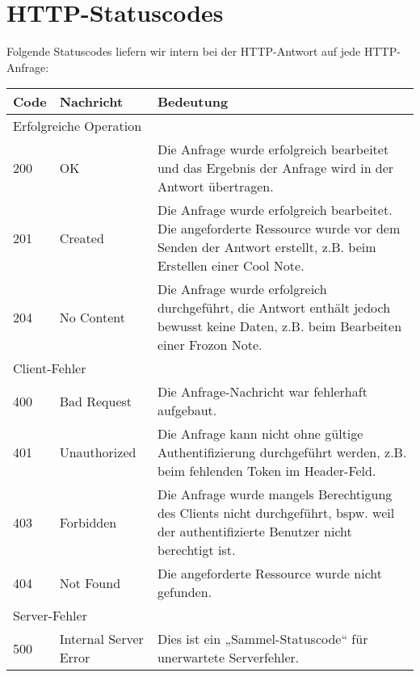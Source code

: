 \documentclass[a4paper]{scrreprt}
\begin{document}
	\section{HTTP-Statuscodes}
	Folgende Statuscodes liefern wir intern bei der HTTP-Antwort auf jede HTTP-Anfrage:
	\begin{flushleft}
		\begin{tabular}{|p{}|p{}|p{}|}
		\hline
		\textbf{Code} & \textbf{Nachricht} & \textbf{Bedeutung} \\
		\hline
		\multicolumn{3}{|l|}{Erfolgreiche Operation} \\
		\hline
		200 & OK & Die Anfrage wurde erfolgreich bearbeitet und das Ergebnis der Anfrage wird in der Antwort übertragen. \\
		201 & Created & Die Anfrage wurde erfolgreich bearbeitet. Die angeforderte Ressource wurde vor dem Senden der Antwort erstellt, z.B. beim Erstellen einer Cool Note. \\
		204 & No Content & Die Anfrage wurde erfolgreich durchgeführt, die Antwort enthält jedoch bewusst keine Daten, z.B. beim Bearbeiten einer Frozon Note. \\
		\hline
		\multicolumn{3}{|l|}{Client-Fehler} \\
		\hline
		400 & Bad Request & Die Anfrage-Nachricht war fehlerhaft aufgebaut. \\
		401 & Unauthorized & Die Anfrage kann nicht ohne gültige Authentifizierung durchgeführt werden, z.B. beim fehlenden Token im Header-Feld. \\
		403 & Forbidden & Die Anfrage wurde mangels Berechtigung des Clients nicht durchgeführt, bspw. weil der authentifizierte Benutzer nicht berechtigt ist. \\
		404 & Not Found & Die angeforderte Ressource wurde nicht gefunden. \\
		\hline
		\multicolumn{3}{|l|}{Server-Fehler} \\
		\hline
		500 & Internal Server Error & Dies ist ein „Sammel-Statuscode“ für unerwartete Serverfehler. \\
		\hline	
		\end{tabular}
	\end{flushleft}
\end{document}
